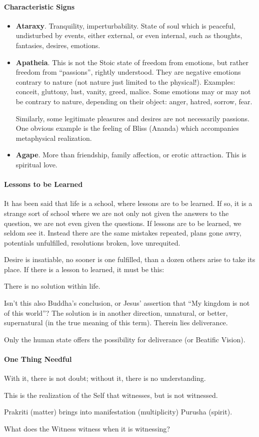 \paragraph{Characteristic Signs}
\begin{itemize}
\item \textbf{Ataraxy}. Tranquility, imperturbability. State of soul which is peaceful, undisturbed by events, either external, or even internal, such as thoughts, fantasies, desires, emotions. 
\item \textbf{Apatheia}. This is not the Stoic state of freedom from emotions, but rather freedom from “passions”, rightly understood. They are negative emotions contrary to nature (not nature just limited to the physical!). Examples: conceit, gluttony, lust, vanity, greed, malice. Some emotions may or may not be contrary to nature, depending on their object: anger, hatred, sorrow, fear.

Similarly, some legitimate pleasures and desires are not necessarily passions. One obvious example is the feeling of Bliss (Ananda) which accompanies metaphysical realization. 
\item \textbf{Agape}. More than friendship, family affection, or erotic attraction. This is spiritual love. 
\end{itemize}
\paragraph{Lessons to be Learned}
It has been said that life is a school, where lessons are to be learned. If so, it is a strange sort of school where we are not only not given the answers to the question, we are not even given the questions. If lessons are to be learned, we seldom see it. Instead there are the same mistakes repeated, plans gone awry, potentials unfulfilled, resolutions broken, love unrequited.

Desire is insatiable, no sooner is one fulfilled, than a dozen others arise to take its place. If there is a lesson to learned, it must be this:

There is no solution within life.

Isn't this also Buddha's conclusion, or Jesus' assertion that “My kingdom is not of this world”? The solution is in another direction, unnatural, or better, supernatural (in the true meaning of this term). Therein lies deliverance.

Only the human state offers the possibility for deliverance (or Beatific Vision).

\paragraph{One Thing Needful}
With it, there is not doubt; without it, there is no understanding.

This is the realization of the Self that witnesses, but is not witnessed.

Prakriti (matter) brings into manifestation (multiplicity) Purusha (spirit).

What does the Witness witness when it is witnessing?



